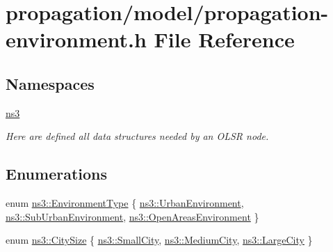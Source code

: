 \hypertarget{propagation-environment_8h}{}\section{propagation/model/propagation-\/environment.h File Reference}
\label{propagation-environment_8h}
\subsection*{Namespaces}
\begin{DoxyCompactItemize}
\item 
 \hyperlink{namespacens3}{ns3}
\begin{DoxyCompactList}\small\item\em Here are defined all data structures needed by an O\+L\+SR node. \end{DoxyCompactList}\end{DoxyCompactItemize}
\subsection*{Enumerations}
\begin{DoxyCompactItemize}
\item 
enum \hyperlink{group__propagation_ga0e392ed771a28c92112047e63308a53a}{ns3\+::\+Environment\+Type} \{ \hyperlink{group__propagation_gga0e392ed771a28c92112047e63308a53aad575d1b07ccac0218783bbd0f523784c}{ns3\+::\+Urban\+Environment}, 
\hyperlink{group__propagation_gga0e392ed771a28c92112047e63308a53aa06cbfe108cde1eb2070702b2ed4fb189}{ns3\+::\+Sub\+Urban\+Environment}, 
\hyperlink{group__propagation_gga0e392ed771a28c92112047e63308a53aa51f78effebc3753d7cd2ee9b5924c028}{ns3\+::\+Open\+Areas\+Environment}
 \}
\item 
enum \hyperlink{group__propagation_ga29c9a1b1a58b6a56054ff5ea4c5a574d}{ns3\+::\+City\+Size} \{ \hyperlink{group__propagation_gga29c9a1b1a58b6a56054ff5ea4c5a574dad3f856f2f166ae12798befabfbd2c99e}{ns3\+::\+Small\+City}, 
\hyperlink{group__propagation_gga29c9a1b1a58b6a56054ff5ea4c5a574dad922b499b70e978a03d2230093e4aacd}{ns3\+::\+Medium\+City}, 
\hyperlink{group__propagation_gga29c9a1b1a58b6a56054ff5ea4c5a574da017d6be2af0a102a6147e6519d63f54c}{ns3\+::\+Large\+City}
 \}
\end{DoxyCompactItemize}
